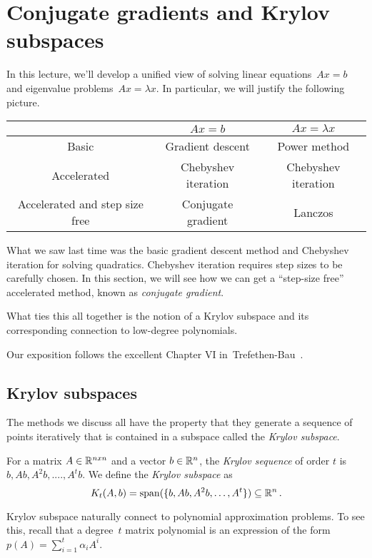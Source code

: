 \section{Conjugate gradients and Krylov subspaces}

In this lecture, we'll develop a unified view of solving linear equations~$Ax=b$
and eigenvalue problems~$Ax=\lambda x.$ In particular, we will justify the
following picture.
%
\begin{center}
\begin{tabular}{ | c |c| c | } 
\hline
 & $Ax=b$ & $Ax=\lambda x$ \\ 
\hline
Basic & Gradient descent & Power method \\ 
\hline
Accelerated & Chebyshev iteration & Chebyshev iteration \\
\hline
Accelerated and step size free & Conjugate gradient & Lanczos \\
\hline
\end{tabular}
\end{center}

What we saw last time was the basic gradient descent method and Chebyshev
iteration for solving quadratics. Chebyshev iteration requires step sizes to be
carefully chosen. In this section, we will see how we can get a ``step-size
free'' accelerated method, known as \emph{conjugate gradient}.

What ties this all together is the notion of a Krylov subspace and its
corresponding connection to low-degree polynomials.

Our exposition follows the excellent Chapter VI
in~Trefethen-Bau~\cite{trefethen97}.

\subsection{Krylov subspaces}
%
The methods we discuss all have the property that they generate a sequence of
points iteratively that is contained in a subspace called the \emph{Krylov
subspace}.
%
\begin{definition}
For a matrix $A \in \mathbb{R}^{n x n}$ and a vector $b \in \mathbb{R}^n$, 
the \emph{Krylov sequence} of order $t$ is $b, Ab, A^2b, ...., A^tb$. 
We define the \emph{Krylov subspace} as
\[
K_t(A,b)=\mathrm{span}(\{b, Ab, A^2b, \ldots, A^t\}) \subseteq \mathbb{R}^n\,.
\]
\end{definition}

Krylov subspace naturally connect to polynomial approximation problems.
To see this, recall that a degree~$t$ matrix polynomial is an expression of the form
$p(A)=\sum_{i=1}^t \alpha_i A^i.$ 

